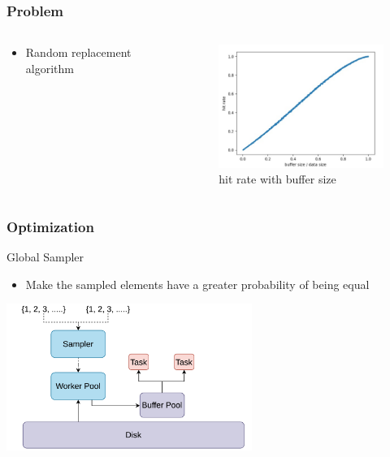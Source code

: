 \documentclass[notheorems, aspectratio=54]{beamer}
\begin{document}
\begin{frame}
    \frametitle{Problem}
    \begin{columns}
        \begin{column}{0.48\textwidth}
            \begin{itemize}
                \item Random replacement algorithm
            \end{itemize}
        \end{column}
        
        \begin{column}{0.48\textwidth}
            \begin{figure}
                \centering
                \includegraphics[width=6cm]{global_img_dir/random_hit_rate.png}
                \caption{hit rate with buffer size}
            \end{figure}
        \end{column}
    
    \end{columns}
\end{frame}

\begin{frame}
    \frametitle{Optimization}
    \begin{block}{Global Sampler}
        \begin{itemize}
            \item Make the sampled elements have a greater probability of being equal
        \end{itemize}
    \end{block}
    \centering
    \includegraphics[width=8cm]{global_img_dir/global_sampling2.png}
\end{frame}
\end{document}
